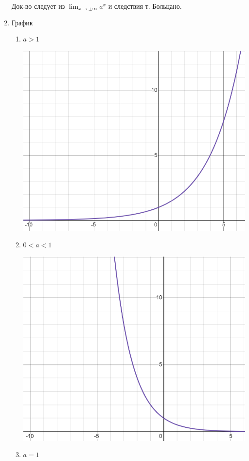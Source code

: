 \documentclass{article}
\begin{document}
\begin{enumerate}
        Док-во следует из \(\lim_{x \to \pm \infty} a^x\) и следствия т. Больцано.

        \item График
        \begin{enumerate}
            \item \( a > 1 \)
            
            \includegraphics[scale=0.4]{11_1_6_3.png}
            \item \( 0 < a < 1 \)
            
            \includegraphics[scale=0.4]{11_1_6_4.png}
            \item \( a = 1 \)
            

\end{enumerate}
\end{enumerate}
\end{document}
